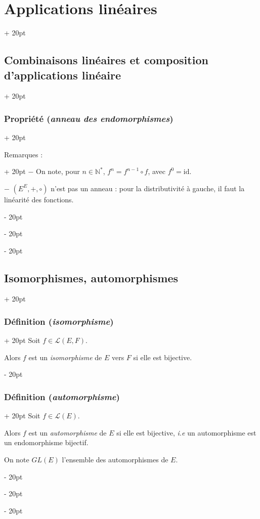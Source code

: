 \documentclass[a4paper, 12pt, twoside]{article}
\newcommand{\N}{\mathbb{N}} %
\newcommand{\lr}[1]{\left( #1 \right)}
\newcommand{\ind}[1][20pt]{\advance\leftskip + #1}
\newcommand{\deind}[1][20pt]{\advance\leftskip - #1}
\newenvironment{indt}[2][20pt]{#2 \par \ind[#1]}{\par \deind} %
\begin{document}
\begin{indt}{\section{Applications linéaires}}
\begin{indt}{\subsection{Combinaisons linéaires et composition d'applications linéaire}}
\begin{indt}{\subsubsection{Propriété (\textit{anneau des endomorphismes})}}
                \vspace{6pt}
                
                \begin{indt}{Remarques :}
                    $-$ On note, pour $n \in \N^*$, %
                    $f^n = f^{n - 1} \circ f$, avec $f^0 = \mathrm{id}$.

                    $-$ $\lr{E^E, +, \circ}$ n'est pas un anneau : pour la distributivité à gauche, il faut la linéarité des fonctions.
                \end{indt}
            \end{indt}
        \end{indt}

        \vspace{12pt}
        
        \begin{indt}{\subsection{Isomorphismes, automorphismes}}
            \begin{indt}{\subsubsection{Définition (\textit{isomorphisme})}}
                Soit $f \in \mathcal L(E, F)$.

                Alors $f$ est un \textit{isomorphisme} de $E$ vers $F$ si elle est bijective.
            \end{indt}

            \vspace{12pt}
            
            \begin{indt}{\subsubsection{Définition (\textit{automorphisme})}}
                Soit $f \in \mathcal L(E)$.

                Alors $f$ est un \textit{automorphisme} de $E$ si elle est bijective, \textit{i.e} un automorphisme est un endomorphisme bijectif.

                On note $GL(E)$ l'ensemble des automorphismes de $E$.
            \end{indt}

            \vspace{12pt}
            

\end{indt}
\end{indt}
\end{document}
